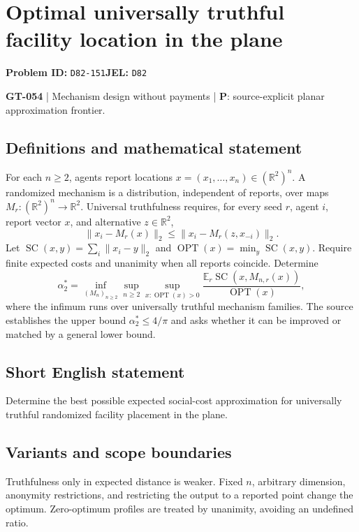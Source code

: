 \documentclass[11pt,a4paper]{article}
\begin{document}
\section*{Optimal universally truthful facility location in the plane}
\textbf{Problem ID:} \texttt{D82-151}\quad \textbf{JEL:} \texttt{D82}\par
\label{problem:OP-0184}
\label{game:GT-054}
{\sffamily\small\color{muted}
\textbf{GT-054} | Mechanism design without payments | \textbf{P}: source-explicit planar approximation frontier.
\par}
\subsection*{Definitions and mathematical statement}
For each $n\geq2$, agents report locations $x=(x_1,\ldots,x_n)\in(\mathbb R^2)^n$. A randomized mechanism is a distribution, independent of reports, over maps $M_r:(\mathbb R^2)^n\to\mathbb R^2$. Universal truthfulness requires, for every seed $r$, agent $i$, report vector $x$, and alternative $z\in\mathbb R^2$,
\[
 \|x_i-M_r(x)\|_2\leq\|x_i-M_r(z,x_{-i})\|_2.
\]
Let $\operatorname{SC}(x,y)=\sum_i\|x_i-y\|_2$ and $\operatorname{OPT}(x)=\min_y\operatorname{SC}(x,y)$. Require finite expected costs and unanimity when all reports coincide. Determine
\[
 \alpha^*_2=\inf_{(M_n)_{n\geq2}}\sup_{n\geq2}
 \sup_{x:\operatorname{OPT}(x)>0}
 \frac{\mathbb E_r\operatorname{SC}(x,M_{n,r}(x))}{\operatorname{OPT}(x)},
\]
where the infimum runs over universally truthful mechanism families. The source establishes the upper bound $\alpha^*_2\leq4/\pi$ and asks whether it can be improved or matched by a general lower bound.
\subsection*{Short English statement}
Determine the best possible expected social-cost approximation for universally truthful randomized facility placement in the plane.
\subsection*{Variants and scope boundaries}
Truthfulness only in expected distance is weaker. Fixed $n$, arbitrary dimension, anonymity restrictions, and restricting the output to a reported point change the optimum. Zero-optimum profiles are treated by unanimity, avoiding an undefined ratio.
\end{document}
